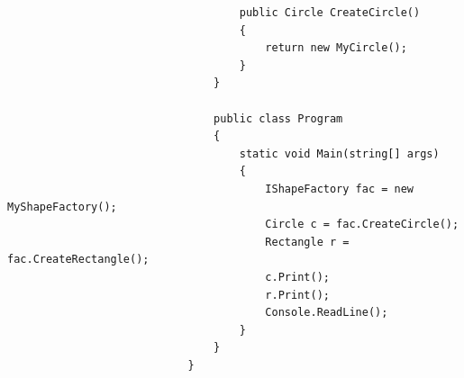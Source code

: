 \documentclass[a4paper,10pt]{article}
\begin{document}
\begin{lstlisting}
                                    public Circle CreateCircle()
                                    {
                                        return new MyCircle();
                                    }
                                }
                            
                                public class Program
                                {
                                    static void Main(string[] args)
                                    {
                                        IShapeFactory fac = new MyShapeFactory();
                                        Circle c = fac.CreateCircle();
                                        Rectangle r = fac.CreateRectangle();
                                        c.Print();
                                        r.Print();
                                        Console.ReadLine();
                                    }
                                }
                            }
                            
                        \end{lstlisting}
        
\end{document}
